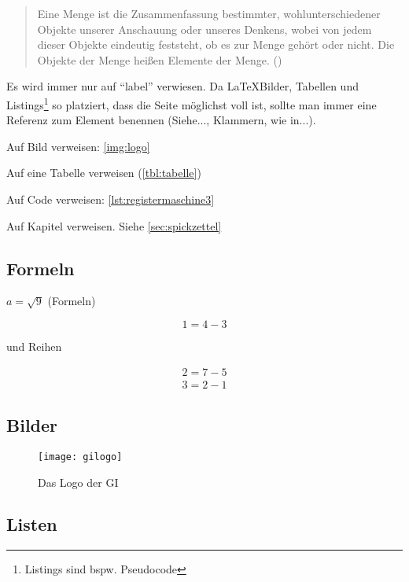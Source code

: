 \begin{quote}
Eine Menge ist die Zusammenfassung bestimmter, wohlunterschiedener
Objekte unserer Anschauung oder unseres Denkens, wobei von jedem
dieser Objekte eindeutig feststeht, ob es zur Menge gehört oder nicht. Die
Objekte der Menge heißen Elemente der Menge.
(\cite[Seite 36]{meinel_mathematische_2009})
\end{quote}

Es wird immer nur auf "`label"' verwiesen. Da \LaTeX Bilder, Tabellen und Listings\footnote{Listings sind bspw. Pseudocode} so platziert, dass die Seite möglichst voll ist, sollte man immer eine Referenz zum Element benennen (Siehe..., Klammern, wie in...).

Auf Bild verweisen: \autoref{img:logo}

Auf eine Tabelle verweisen (\autoref{tbl:tabelle})

Auf Code verweisen: \autoref{lst:registermaschine3}

Auf Kapitel verweisen. Siehe \autoref{sec:spickzettel}

\subsection{Formeln}

$a=\sqrt{9}$ (Formeln)

\begin{equation}
  1=4-3
\end{equation}

und Reihen

\begin{eqnarray}
  2=7-5\\
  3=2-1
\end{eqnarray}

\subsection{Bilder}
\begin{figure}[h!]
  \begin{center}
    \texttt{[image: gilogo]}
    \caption[Das Logo der GI]{\label{img:logo}Das Logo der GI \cite[Seite 36]{meinel_mathematische_2009}}
  \end{center}
\end{figure}

\subsection{Listen}

